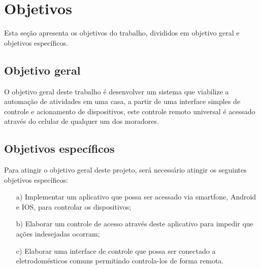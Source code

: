 \chapter{Objetivos}
Esta seção apresenta os objetivos do trabalho, divididos em objetivo geral e objetivos específicos.

\section{Objetivo geral}

O objetivo geral deste trabalho é desenvolver um sistema que viabilize a automação de atividades em uma casa, a partir de uma interface simples de controle e acionamento de dispositivos, este controle remoto universal é acessado através do celular de qualquer um dos moradores.

\section{Objetivos específicos}
Para atingir o objetivo geral deste projeto, será necessário atingir os seguintes objetivos específicos:

\begin{itemize}
    \item[a)] Implementar um aplicativo que possa ser acessado via smartfone, Android e IOS, para controlar os dispositivos;
    \item[b)] Elaborar um controle de acesso através deste aplicativo para impedir que ações indesejadas ocorram;
    \item[c)] Elaborar uma interface de controle que possa ser conectado a eletrodomésticos comuns permitindo controla-los de forma remota.
\end{itemize}

